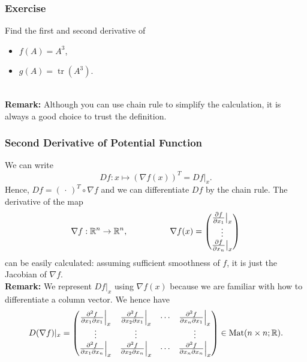 \documentclass[11pt, t]{beamer}
\newcommand{\nullspace}{~\\[15pt]}
\begin{document}
\begin{frame}
    \frametitle{Exercise}
    Find the first and second derivative of
    \begin{itemize}
        \item $f(A)=A^3$,
        \item $g(A)=\operatorname{tr}(A^3)$.
    \end{itemize}
    \nullspace
    \textbf{Remark:} Although you can use chain rule to simplify the calculation, it is always a good choice to trust the definition.
\end{frame}

\begin{frame}[allowframebreaks]
    \frametitle{Second Derivative of Potential Function}
    We can write
    \[Df:x\mapsto(\nabla f(x))^T=Df|_x.\]
    Hence, $Df=(\,\cdot\,)^T\circ\nabla f$ and we can dif{}ferentiate $Df$ by the chain rule. The derivative of the map
    \[\nabla f:\mathbb{R}^n\to\mathbb{R}^n,\qquad\qquad\quad
        \nabla f(x)=\begin{pmatrix}
            \frac{\partial f}{\partial x_1}\big|_x \\
            \vdots                                 \\
            \frac{\partial f}{\partial x_n}\big|_x
        \end{pmatrix}\]
    \vspace*{-1pt}
    can be easily calculated: assuming suf{}ficient smoothness of $f$, it is just the Jacobian of $\nabla f$.
    \nullspace
    \textbf{Remark:} We represent $Df|_x$ using $\nabla f(x)$ because we are familiar with how to differentiate a column vector.
    \newpage
    We hence have
    \begin{equation}\label{2.5.2}
        D(\nabla f)|_x=\begin{pmatrix}
            \frac{\partial^2 f}{\partial x_1\partial x_1}\Big|_x & \frac{\partial^2 f}{\partial x_2\partial x_1}\Big|_x & \cdots & \frac{\partial^2 f}{\partial x_n\partial x_1}\Big|_x \\
            \vdots                                               & \vdots                                               &        & \vdots                                               \\
            \frac{\partial^2 f}{\partial x_1\partial x_n}\Big|_x & \frac{\partial^2 f}{\partial x_2\partial x_n}\Big|_x & \cdots & \frac{\partial^2 f}{\partial x_n\partial x_n}\Big|_x
        \end{pmatrix}\in\text{Mat}(n\times n;\mathbb{R}).
    \end{equation}

\end{frame}
\end{document}
